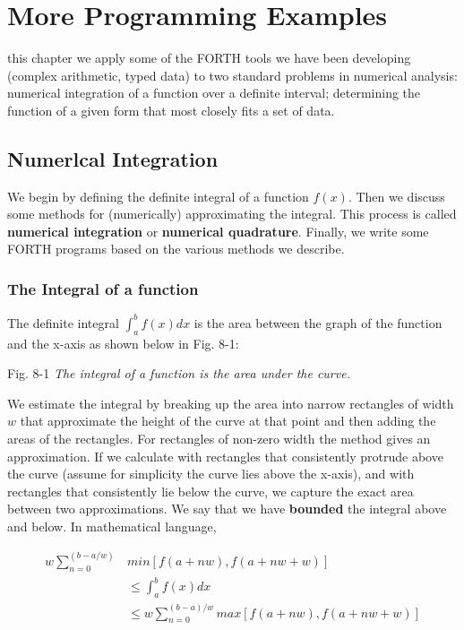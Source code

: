 \chapter{More Programming Examples}
\startcontents[chapters]

 this chapter we apply some of the FORTH tools we have been developing (complex arithmetic, typed data) to two standard problems in numerical analysis: numerical integration of a function over a deﬁnite interval; determining the function of a given form that most closely fits a set of data.

\section{Numerlcal Integration}
We begin by defining the definite integral of a function $f(x)$. Then we discuss some methods for (numerically) approximating the integral. This process is called \textbf{numerical integration} or \textbf{numerical quadrature}. Finally, we write some FORTH programs based on the various methods we describe.

\subsection{The Integral of a function}
The definite integral $\int_{a}^{b}f(x) dx$ is the area between the graph of the function and the x-axis as shown below in Fig. 8-1:

Fig. 8-1 \textit{The integral of a function is the area under the curve.}

We estimate the integral by breaking up the area into narrow
rectangles of width $w$ that approximate the height of the curve at that point and then adding the areas of the rectangles. For rectangles of non-zero width the method gives an approximation. If we calculate with rectangles that consistently protrude above the curve (assume for simplicity the curve lies above the x-axis), and with rectangles that consistently lie below the curve, we capture the exact area between two approximations. We say that we have \textbf{bounded} the integral above and below. In mathematical language,

\begin{equation}
\begin{align}
w \sum_{n=0}^{(b-a/w)} &min[f(a+nw),f(a+nw+w)] \\

&\leq \int_{a}^{b}f(x) dx \\

&\leq w \sum_{n=0}^{(b-a)/w} max[f(a+nw),f(a+nw+w)]
\end{align}
\end{equation}


